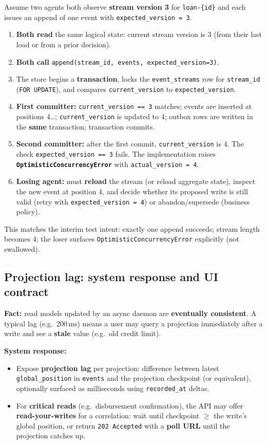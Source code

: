 \documentclass[11pt,a4paper]{article}
\begin{document}
Assume two agents both observe \textbf{stream version 3} for \texttt{loan-\{id\}} and each issues an append of one event with \texttt{expected\_version = 3}.

\begin{enumerate}[leftmargin=*]
  \item \textbf{Both read} the same logical state: current stream version is 3 (from their last load or from a prior decision).
  \item \textbf{Both call} \texttt{append(stream\_id, events, expected\_version=3)}.
  \item The store begins a \textbf{transaction}, locks the \texttt{event\_streams} row for \texttt{stream\_id} (\texttt{FOR UPDATE}), and compares \texttt{current\_version} to \texttt{expected\_version}.
  \item \textbf{First committer:} \texttt{current\_version == 3} matches; events are inserted at positions 4\ldots; \texttt{current\_version} is updated to 4; outbox rows are written in the \textbf{same} transaction; transaction commits.
  \item \textbf{Second committer:} after the first commit, \texttt{current\_version} is 4. The check \texttt{expected\_version == 3} fails. The implementation raises \textbf{\texttt{OptimisticConcurrencyError}} with \texttt{actual\_version = 4}.
  \item \textbf{Losing agent:} must \textbf{reload} the stream (or reload aggregate state), inspect the new event at position 4, and decide whether its proposed write is still valid (retry with \texttt{expected\_version = 4}) or abandon/supersede (business policy).
\end{enumerate}

This matches the interim test intent: exactly one append succeeds; stream length becomes 4; the loser surfaces \texttt{OptimisticConcurrencyError} explicitly (not swallowed).

\subsection{Projection lag: system response and UI contract}

\textbf{Fact:} read models updated by an async daemon are \textbf{eventually consistent}. A typical lag (e.g.\ 200\,ms) means a user may query a projection immediately after a write and see a \textbf{stale} value (e.g.\ old credit limit).

\textbf{System response:}
\begin{itemize}[leftmargin=*]
  \item Expose \textbf{projection lag} per projection: difference between latest \texttt{global\_position} in \texttt{events} and the projection checkpoint (or equivalent), optionally surfaced as milliseconds using \texttt{recorded\_at} deltas.
  \item For \textbf{critical reads} (e.g.\ disbursement confirmation), the API may offer \textbf{read-your-writes} for a correlation: wait until checkpoint $\geq$ the write's global position, or return \texttt{202 Accepted} with a \textbf{poll URL} until the projection catches up.
\end{itemize}
\end{document}
